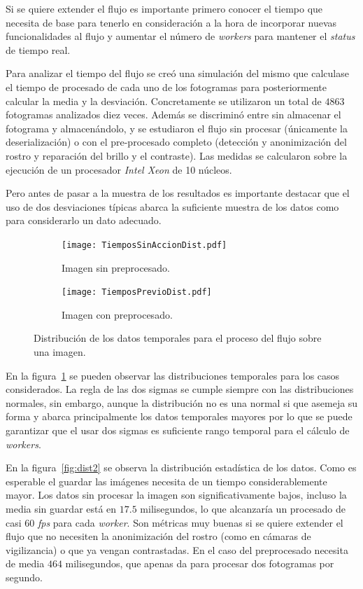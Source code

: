 Si se quiere extender el flujo es importante primero conocer el tiempo que necesita de base para tenerlo en consideración a la hora de incorporar nuevas funcionalidades al flujo y aumentar el número de \textit{workers} para mantener el \textit{status} de tiempo real.

Para analizar el tiempo del flujo se creó una simulación del mismo que calculase el tiempo de procesado de cada uno de los fotogramas para posteriormente calcular la media y la desviación. Concretamente se utilizaron un total de $4863$ fotogramas analizados diez veces. Además se discriminó entre sin almacenar el fotograma y almacenándolo, y se estudiaron el flujo sin procesar (únicamente la deserialización) o con el pre-procesado completo (detección y anonimización del rostro y reparación del brillo y el contraste). Las medidas se calcularon sobre la ejecución de un procesador \textit{Intel Xeon} de 10 núcleos.

Pero antes de pasar a la muestra de los resultados es importante destacar que el uso de dos desviaciones típicas abarca la suficiente muestra de los datos como para considerarlo un dato adecuado. 

\begin{figure}
	\begin{subfigure}[b]{\textwidth}
		\texttt{[image: TiemposSinAccionDist.pdf]}
		\caption{Imagen sin preprocesado.}
	\end{subfigure}
	\begin{subfigure}[b]{\textwidth}
		\texttt{[image: TiemposPrevioDist.pdf]}
		\caption{Imagen con preprocesado.}
	\end{subfigure}
	\caption{Distribución de los datos temporales para el proceso del flujo sobre una imagen.}
	\label{fig:dist1}
\end{figure}


En la figura~\ref{fig:dist1} se pueden observar las distribuciones temporales para los casos considerados. La regla de las dos sigmas se cumple siempre con las distribuciones normales, sin embargo, aunque la distribución no es una normal si que asemeja su forma y abarca principalmente los datos temporales mayores por lo que se puede garantizar que el usar dos sigmas es suficiente rango temporal para el cálculo de \textit{workers}.

En la figura~\ref{fig:dist2} se observa la distribución estadística de los datos. Como es esperable el guardar las imágenes necesita de un tiempo considerablemente mayor. Los datos sin procesar la imagen son significativamente bajos, incluso la media sin guardar está en $17.5$ milisegundos, lo que alcanzaría un procesado de casi $60$ \textit{fps} para cada \textit{worker}. Son métricas muy buenas si se quiere extender el flujo que no necesiten la anonimización del rostro (como en cámaras de vigilizancia) o que ya vengan contrastadas. En el caso del preprocesado necesita de media $464$ milisegundos, que apenas da para procesar dos fotogramas por segundo.

